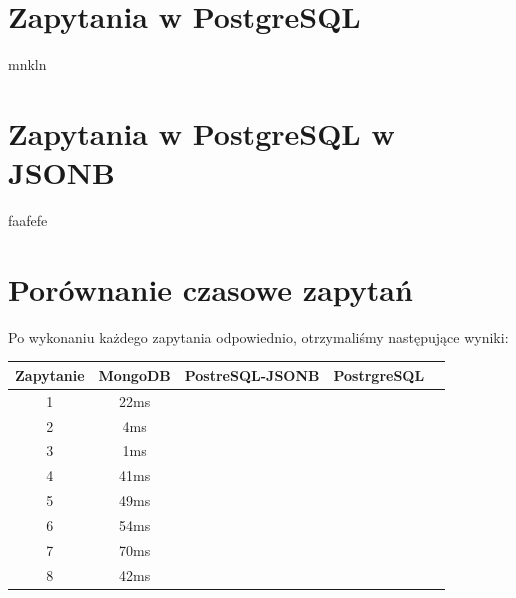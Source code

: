 \documentclass[11pt]{article}
\begin{document}
\newpage
\section{Zapytania w PostgreSQL}
	mnkln
\section{Zapytania w PostgreSQL w JSONB}
	faafefe
\section{Porównanie czasowe zapytań}
	Po wykonaniu każdego zapytania odpowiednio, otrzymaliśmy następujące wyniki:
	\begin{table}[!ht]
	\begin{center}
		\begin{tabular}{ccccc}
			\toprule
			Zapytanie & MongoDB & PostreSQL-JSONB & PostrgreSQL &  \\
			\midrule
			1         & 22ms    &                 &             &  \\
			\midrule
			2         & 4ms     &                 &             &  \\
			\midrule
			3		  & 1ms     &                 &             &  \\
			\midrule
			4		  & 41ms    &                 &             &  \\
			\midrule
			5		  & 49ms    &                 &             &  \\
			\midrule
			6		  & 54ms    &                 &             &  \\
			\midrule
			7		  & 70ms    &                 &             &  \\
			\midrule
			8		  & 42ms    &                 &             &  \\
			\bottomrule
		\end{tabular}
	\end{center}
	\end{table}
\end{document}
